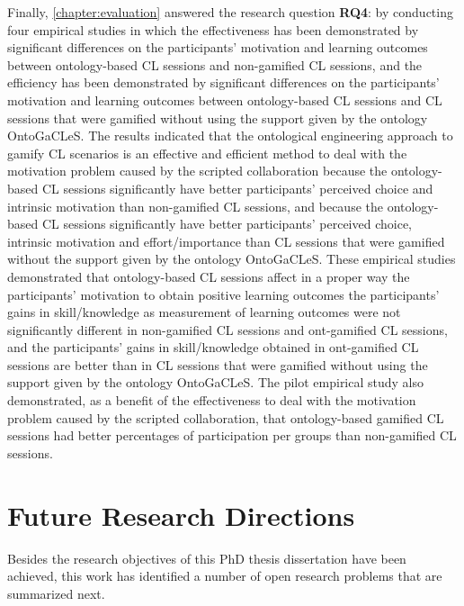 Finally, \autoref{chapter:evaluation} answered the research question 
\textbf{RQ4}:  by conducting four empirical studies in which the effectiveness has been demonstrated by significant differences on the participants' motivation and learning outcomes between ontology-based CL sessions and non-gamified CL sessions, and the efficiency has been demonstrated by significant differences on the participants' motivation and learning outcomes between ontology-based CL sessions and CL sessions that were gamified without using the support given by the ontology OntoGaCLeS. The results indicated that the ontological engineering approach to gamify CL scenarios is an effective and efficient method to deal with the motivation problem caused by the scripted collaboration because the ontology-based CL sessions significantly have better participants' perceived choice and intrinsic motivation than non-gamified CL sessions, and because the ontology-based CL sessions significantly have better participants' perceived choice, intrinsic motivation and effort/importance than CL sessions that were gamified without the support given by the ontology OntoGaCLeS. These empirical studies demonstrated that ontology-based CL sessions affect in a proper way the participants' motivation to obtain positive learning outcomes the participants' gains in skill/knowledge as measurement of learning outcomes were not significantly different in non-gamified CL sessions and ont-gamified CL sessions, and the participants' gains in skill/knowledge obtained in ont-gamified CL sessions are better than in CL sessions that were gamified without using the support given by the ontology OntoGaCLeS. The pilot empirical study also demonstrated, as a benefit of the effectiveness to deal with the motivation problem caused by the scripted collaboration, that ontology-based gamified CL sessions had better percentages of participation per groups than non-gamified CL sessions.

\section{Future Research Directions}
\label{sec:future-research-directions}

Besides the research objectives of this PhD thesis dissertation have been achieved, this work has identified a number of open research problems that are summarized next.

